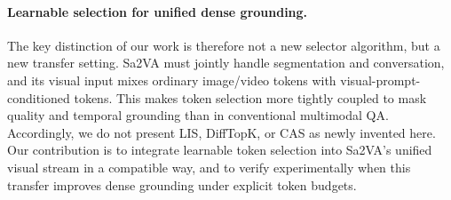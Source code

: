\paragraph{Learnable selection for unified dense grounding.}
The key distinction of our work is therefore not a new selector algorithm, but a new transfer setting.
Sa2VA must jointly handle segmentation and conversation, and its visual input mixes ordinary image/video tokens with visual-prompt-conditioned tokens.
This makes token selection more tightly coupled to mask quality and temporal grounding than in conventional multimodal QA.
Accordingly, we do not present LIS, DiffTopK, or CAS as newly invented here.
Our contribution is to integrate learnable token selection into Sa2VA's unified visual stream in a compatible way, and to verify experimentally when this transfer improves dense grounding under explicit token budgets.

